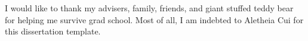 
I would like to thank my advisers, family, friends, and giant stuffed teddy bear for helping me survive grad school. Most of all, I am indebted to Aletheia Cui for this dissertation template.

\lipsum[42-47]
